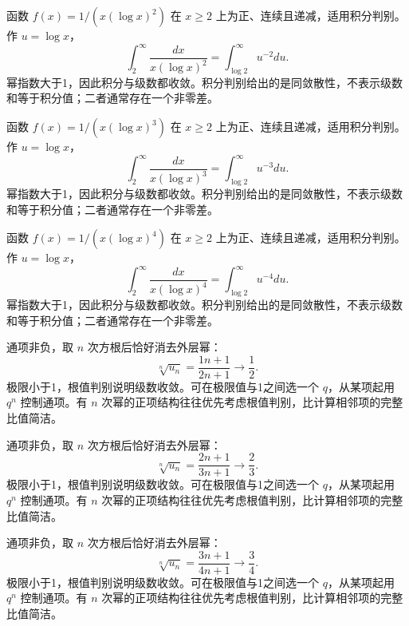 \documentclass[12pt,fontset=fandol]{ctexart}
\begin{document}
\begin{solve}\label{ans:c25q4}
函数 $f(x)=1/(x(\log x)^{2})$ 在 $x\ge2$ 上为正、连续且递减，适用积分判别。作 $u=\log x$，
\[
\int_2^\infty\frac{dx}{x(\log x)^{2}}=\int_{\log2}^\infty u^{-2}du.
\]
幂指数大于1，因此积分与级数都收敛。积分判别给出的是同敛散性，不表示级数和等于积分值；二者通常存在一个非零差。
\end{solve}

\begin{solve}\label{ans:c25q5}
函数 $f(x)=1/(x(\log x)^{3})$ 在 $x\ge2$ 上为正、连续且递减，适用积分判别。作 $u=\log x$，
\[
\int_2^\infty\frac{dx}{x(\log x)^{3}}=\int_{\log2}^\infty u^{-3}du.
\]
幂指数大于1，因此积分与级数都收敛。积分判别给出的是同敛散性，不表示级数和等于积分值；二者通常存在一个非零差。
\end{solve}

\begin{solve}\label{ans:c25q6}
函数 $f(x)=1/(x(\log x)^{4})$ 在 $x\ge2$ 上为正、连续且递减，适用积分判别。作 $u=\log x$，
\[
\int_2^\infty\frac{dx}{x(\log x)^{4}}=\int_{\log2}^\infty u^{-4}du.
\]
幂指数大于1，因此积分与级数都收敛。积分判别给出的是同敛散性，不表示级数和等于积分值；二者通常存在一个非零差。
\end{solve}

\begin{solve}\label{ans:c25q7}
通项非负，取 $n$ 次方根后恰好消去外层幂：
\[
\sqrt[n]{u_n}=\frac{1n+1}{2n+1}\longrightarrow \frac{1}{2}.
\]
极限小于1，根值判别说明级数收敛。可在极限值与1之间选一个 $q$，从某项起用 $q^n$ 控制通项。有 $n$ 次幂的正项结构往往优先考虑根值判别，比计算相邻项的完整比值简洁。
\end{solve}

\begin{solve}\label{ans:c25q8}
通项非负，取 $n$ 次方根后恰好消去外层幂：
\[
\sqrt[n]{u_n}=\frac{2n+1}{3n+1}\longrightarrow \frac{2}{3}.
\]
极限小于1，根值判别说明级数收敛。可在极限值与1之间选一个 $q$，从某项起用 $q^n$ 控制通项。有 $n$ 次幂的正项结构往往优先考虑根值判别，比计算相邻项的完整比值简洁。
\end{solve}

\begin{solve}\label{ans:c25q9}
通项非负，取 $n$ 次方根后恰好消去外层幂：
\[
\sqrt[n]{u_n}=\frac{3n+1}{4n+1}\longrightarrow \frac{3}{4}.
\]
极限小于1，根值判别说明级数收敛。可在极限值与1之间选一个 $q$，从某项起用 $q^n$ 控制通项。有 $n$ 次幂的正项结构往往优先考虑根值判别，比计算相邻项的完整比值简洁。
\end{solve}
\end{document}
